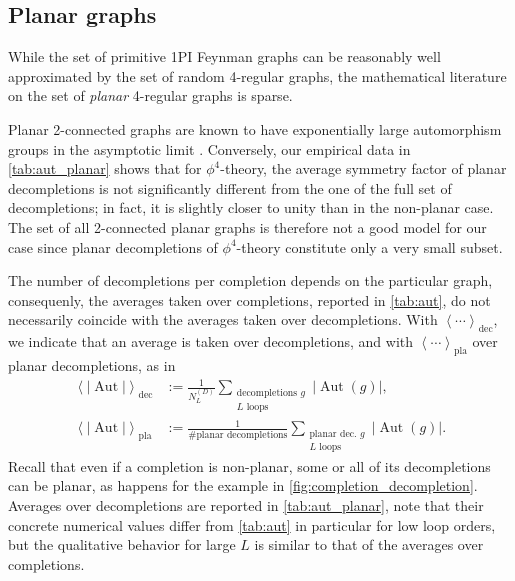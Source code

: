 \documentclass[12pt,a4paper]{article}
\newcommand{\abs}[1]{\lvert #1 \rvert}
\newcommand{\Aut}{\operatorname{Aut}}
\renewcommand{\|}{\rule[-0.4ex]{0.2ex}{1.2em}}
\begin{document}
\FloatBarrier

\subsection{Planar graphs}\label{sec:planar_graphs}

While the set of primitive 1PI Feynman graphs can be reasonably well approximated by the set of random 4-regular graphs, the mathematical literature on the set of \emph{planar} 4-regular graphs is sparse. 

Planar 2-connected graphs are known to have exponentially large automorphism groups in the asymptotic limit  \cite{bender_number_2002}. Conversely, our empirical  data  in \cref{tab:aut_planar} shows that for $\phi^4$-theory, the average symmetry factor of planar decompletions  is not significantly different from the one of the full set of decompletions; in fact, it is slightly closer to unity than in the non-planar case. The set of all 2-connected planar graphs is therefore not a good model for our case since planar decompletions of $\phi^4$-theory constitute only a very small subset.



The number of decompletions per completion depends on the particular graph, consequenly, the averages taken over   completions, reported in \cref{tab:aut}, do not necessarily coincide with the averages taken over decompletions. With $\left \langle  \cdots \right \rangle _\text{dec}$, we indicate that an average is taken over decompletions,  and with $\left \langle \cdots \right \rangle _{\text{pla}}$  over planar decompletions, as in 
\begin{align} \label{def:mean_dec}
	\left \langle \abs{\Aut}    \right \rangle _\text{dec} &:= \frac{1}{  N^{(D)}_L  } \sum_{\substack{ \text{decompletions }g \\ L \text{ loops} }}  \abs{\Aut(g)} ,  \\
	\left \langle  \abs{\Aut } \right \rangle _\text{pla} &:= \frac{1}{  \# \text{planar decompletions} } \sum_{\substack{ \text{planar dec. }g \\ L \text{ loops} }}  \abs{\Aut (g)}. \nonumber
\end{align}
Recall that even if a completion is non-planar, some or all of its decompletions can be planar, as happens for the example in  \cref{fig:completion_decompletion}. 
Averages over decompletions are reported in \cref{tab:aut_planar}, note that their concrete numerical values differ from \cref{tab:aut} in particular for low loop orders, but the qualitative behavior for large $L$ is similar to that of the averages over completions. 
\end{document}
